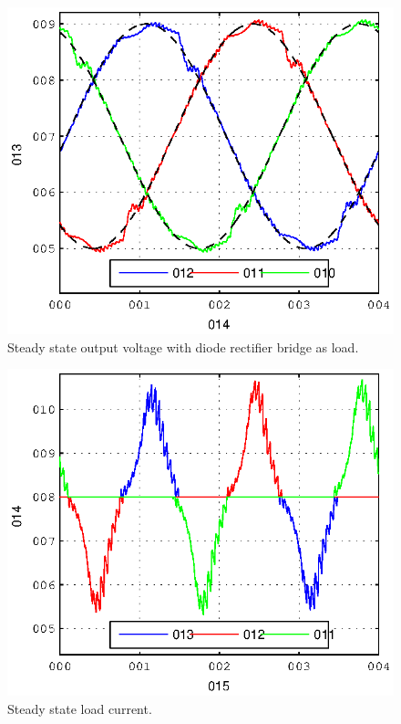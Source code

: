 \documentclass[conference,10pt]{IEEEtran}
\begin{document}
\begin{figure}[!h]
\centering

\includegraphics{fig/steady_state_vCf}
\caption{Steady state output voltage with diode rectifier bridge as load.}
\label{fig:ss_vc}
\end{figure}
\begin{figure}[!h]
\centering

\includegraphics{fig/steady_state_iLoad}
\caption{Steady state load current.}
\label{fig:ss_iload}
\end{figure}
\end{document}
